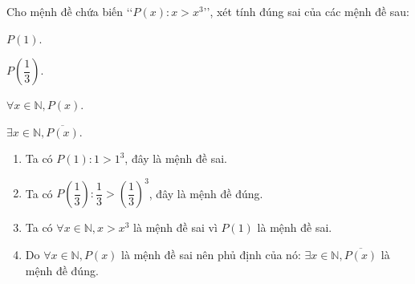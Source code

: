 \begin{bt}%
	Cho mệnh đề chứa biến \lq\lq$P(x)\colon x>x^3$\rq\rq, xét tính đúng sai của các mệnh đề sau:
	\begin{listEX}[4]
		\item $P(1)$.
		\item $P\left(\dfrac{1}{3}\right)$.
		\item $\forall x\in\mathbb{N},P(x)$.
		\item $\exists x\in\mathbb{N},\overline{P(x)}$.
	\end{listEX}
	\loigiai
	{\begin{enumerate}
			\item Ta có $P(1): 1>1^3$, đây là mệnh đề sai.
			\item Ta có $P\left(\dfrac{1}{3}\right):\dfrac{1}{3}>\left(\dfrac{1}{3}\right)^3$, đây là mệnh đề đúng.
			\item Ta có $\forall x\in\mathbb{N},x>x^3$ là mệnh đề sai vì $P(1)$ là mệnh đề sai.
			\item Do $\forall x\in\mathbb{N},P(x)$ là mệnh đề sai nên phủ định của nó: $\exists x\in\mathbb{N},\overline{P(x)}$ là mệnh đề đúng. 
		\end{enumerate}	
	}
\end{bt}
